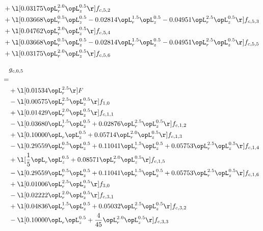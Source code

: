 \begin{alignat}{2}
& + \l[  0.03175 \opL_r^{2.0} \opL_z^{0.5}  \r] f_{c,5,2} \nonumber \\ 
& + \l[  0.03668 \opL_r^{0.5} \opL_z^{0.5}   -0.02814 \opL_r^{1.5} \opL_z^{0.5}   -0.04951 \opL_r^{2.5} \opL_z^{0.5}  \r] f_{c,5,3} \nonumber \\ 
& + \l[  0.04762 \opL_r^{2.0} \opL_z^{0.5}  \r] f_{c,5,4} \nonumber \\ 
& + \l[  0.03668 \opL_r^{0.5} \opL_z^{0.5}   -0.02814 \opL_r^{1.5} \opL_z^{0.5}   -0.04951 \opL_r^{2.5} \opL_z^{0.5}  \r] f_{c,5,5} \nonumber \\ 
& + \l[  0.03175 \opL_r^{2.0} \opL_z^{0.5}  \r] f_{c,5,6} \nonumber \\ 
\end{alignat} 


\begin{alignat}{2} 
\label{eq:g_05_0} 
& g_{c,0,5} \nonumber \\ 
 = \\ 
& + \l[  0.01534 \opL_r^{2.5}  \r] F \nonumber \\ 
& - \l[  0.00575 \opL_r^{2.5} \opL_z^{0.5}  \r] f_{1,0} \nonumber \\ 
& + \l[  0.01429 \opL_r^{2.0} \opL_z^{0.5}  \r] f_{c,1,1} \nonumber \\ 
& - \l[  0.03680 \opL_r^{1.5} \opL_z^{0.5} +  0.02876 \opL_r^{2.5} \opL_z^{0.5}  \r] f_{c,1,2} \nonumber \\ 
& + \l[  0.10000 \opL_r \opL_z^{0.5} +  0.05714 \opL_r^{2.0} \opL_z^{0.5}  \r] f_{c,1,3} \nonumber \\ 
& - \l[  0.29559 \opL_r^{0.5} \opL_z^{0.5} +  0.11041 \opL_r^{1.5} \opL_z^{0.5} +  0.05753 \opL_r^{2.5} \opL_z^{0.5}  \r] f_{c,1,4} \nonumber \\ 
& + \l[ \frac{1}{5} \opL_r \opL_z^{0.5} +  0.08571 \opL_r^{2.0} \opL_z^{0.5}  \r] f_{c,1,5} \nonumber \\ 
& - \l[  0.29559 \opL_r^{0.5} \opL_z^{0.5} +  0.11041 \opL_r^{1.5} \opL_z^{0.5} +  0.05753 \opL_r^{2.5} \opL_z^{0.5}  \r] f_{c,1,6} \nonumber \\ 
& + \l[  0.01006 \opL_r^{2.5} \opL_z^{0.5}  \r] f_{3,0} \nonumber \\ 
& - \l[  0.02222 \opL_r^{2.0} \opL_z^{0.5}  \r] f_{c,3,1} \nonumber \\ 
& + \l[  0.04836 \opL_r^{1.5} \opL_z^{0.5} +  0.05032 \opL_r^{2.5} \opL_z^{0.5}  \r] f_{c,3,2} \nonumber \\ 
& - \l[  0.10000 \opL_r \opL_z^{0.5} + \frac{4}{45} \opL_r^{2.0} \opL_z^{0.5}  \r] f_{c,3,3} \nonumber \\ 

\end{alignat}
